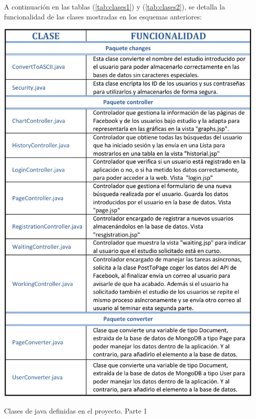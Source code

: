 A continuación en las tablas (\ref{tab:clases1}) y (\ref{tab:clases2}), se detalla la funcionalidad de las clases mostradas en los esquemas anteriores:
\begin{table}[H]
	\centering
	\includegraphics[width=5.2in]{PDF/Clasesjava1.pdf}
	\caption{Clases de java definidas en el proyecto. Parte 1}
	\label{tab:clases1}
\end{table}
